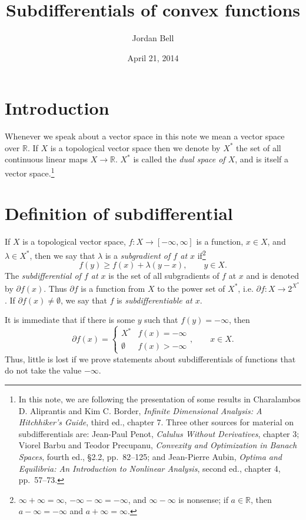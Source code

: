 \documentclass{article}
\theoremstyle{definition}
\begin{document}
\title{Subdifferentials of convex functions}
\author{Jordan Bell}
\date{April 21, 2014}

\maketitle

\section{Introduction}
Whenever we speak about a vector space in this note we mean a vector space over $\mathbb{R}$. If $X$ is a topological vector space then
we denote by $X^*$ the set of all continuous linear maps $X \to \mathbb{R}$.  $X^*$ is called the {\em dual space of $X$}, and is itself a vector space.\footnote{In this note,
we are
following the presentation of some results in Charalambos D. Aliprantis and Kim C. Border, {\em Infinite Dimensional Analysis: A Hitchhiker's Guide}, third ed., chapter 7. Three other sources
for material on subdifferentials are: Jean-Paul Penot, {\em Calulus Without Derivatives}, chapter 3; Viorel Barbu and Teodor Precupanu,  {\em Convexity and Optimization in Banach Spaces}, fourth ed., \S 2.2, pp.~82--125;
and Jean-Pierre Aubin, {\em Optima and Equilibria: An Introduction to Nonlinear Analysis}, second ed., chapter 4, pp.~57--73.}


\section{Definition of subdifferential}
If $X$ is a topological vector space, $f:X \to [-\infty,\infty]$ is a function, $x \in X$, and $\lambda \in X^*$, then we say that $\lambda$ is a
{\em subgradient of $f$ at $x$} if\footnote{$\infty+\infty=\infty$, $-\infty-\infty=-\infty$, and $\infty-\infty$ is nonsense; if $a \in \mathbb{R}$, then $a-\infty=-\infty$ and $a+\infty=\infty$.}
\[
f(y) \geq f(x) + \lambda(y-x), \qquad y \in X.
\]
The {\em subdifferential of $f$ at $x$} is the set of all subgradients of $f$ at $x$ and is denoted by $\partial f(x)$. Thus
$\partial f$ is a function from $X$ to the power set of $X^*$, i.e. $\partial f:X \to 2^{X^*}$. If $\partial f(x) \neq \emptyset$, we say that $f$ is {\em subdifferentiable at $x$}.

It is immediate that if there is some $y$ such that $f(y)=-\infty$, then
\[
\partial f(x) = \begin{cases}
X^*&f(x) = -\infty\\
\emptyset&f(x) > -\infty
\end{cases},\qquad x\in X.
\]
Thus, little is lost if we prove statements about subdifferentials of functions that do not take the value $-\infty$.
\end{document}

